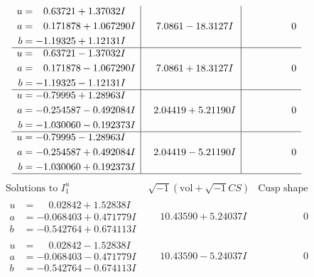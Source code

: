 \documentclass[1p]{elsarticle_modified}
\theoremstyle{definition}
\newcommand{\I}{\sqrt{-1}}
\begin{document}
$$\begin{array}{c|c|c}
\begin{aligned}
u &= \phantom{-}0.63721 + 1.37032 I \\
a &= \phantom{-}0.171878 + 1.067290 I \\
b &= -1.19325 + 1.12131 I\end{aligned}
 & \phantom{-}7.0861 - 18.3127 I & \phantom{-0.000000 } 0 \\ \hline\begin{aligned}
u &= \phantom{-}0.63721 - 1.37032 I \\
a &= \phantom{-}0.171878 - 1.067290 I \\
b &= -1.19325 - 1.12131 I\end{aligned}
 & \phantom{-}7.0861 + 18.3127 I & \phantom{-0.000000 } 0 \\ \hline\begin{aligned}
u &= -0.79995 + 1.28963 I \\
a &= -0.254587 - 0.492084 I \\
b &= -1.030060 - 0.192373 I\end{aligned}
 & \phantom{-}2.04419 + 5.21190 I & \phantom{-0.000000 } 0 \\ \hline\begin{aligned}
u &= -0.79995 - 1.28963 I \\
a &= -0.254587 + 0.492084 I \\
b &= -1.030060 + 0.192373 I\end{aligned}
 & \phantom{-}2.04419 - 5.21190 I & \phantom{-0.000000 } 0\\
 \hline 
 \end{array}$$\newpage$$\begin{array}{c|c|c}  
\text{Solutions to }I^u_{1}& \I (\text{vol} + \sqrt{-1}CS) & \text{Cusp shape}\\
 \hline 
\begin{aligned}
u &= \phantom{-}0.02842 + 1.52838 I \\
a &= -0.068403 + 0.471779 I \\
b &= -0.542764 + 0.674113 I\end{aligned}
 & \phantom{-}10.43590 + 5.24037 I & \phantom{-0.000000 } 0 \\ \hline\begin{aligned}
u &= \phantom{-}0.02842 - 1.52838 I \\
a &= -0.068403 - 0.471779 I \\
b &= -0.542764 - 0.674113 I\end{aligned}
 & \phantom{-}10.43590 - 5.24037 I & \phantom{-0.000000 } 0 \\ \hline\begin{aligned}

\end{aligned}
\end{array}$$
\end{document}
